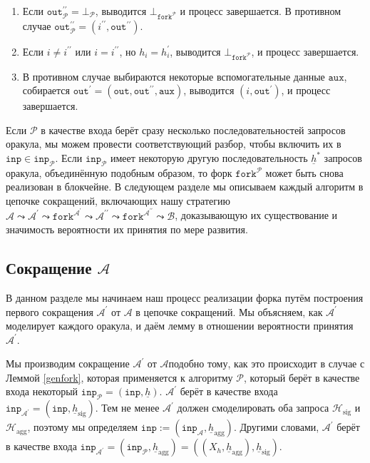 \documentclass{mrl}
\theoremstyle{definition}
\numberwithin{theorem}{subsection}
\newcommand{\adversary}{\mathcal{A}}
\newcommand{\reduxChain}{\adversary \leadsto \adversary^\prime \leadsto \texttt{fork}^{\adversary^\prime} \leadsto \adversary^{\prime \prime} \leadsto \texttt{fork}^{\adversary^{\prime \prime}} \leadsto \mathcal{B}}
\begin{document}
\begin{description}
\begin{enumerate}
\item Если $\texttt{out}_{\mathcal{P}}^{\prime \prime} = \bot_\mathcal{P}$, выводится $\bot_{\texttt{fork}^{\mathcal{P}}}$ и процесс завершается. В противном случае $\texttt{out}_{\mathcal{P}}^{\prime \prime} = (i^{\prime \prime}, \texttt{out}^{\prime \prime})$.

\item Если $i \neq i^{\prime \prime}$ или $i = i^{\prime \prime}$, но $h_{i} = h^{\prime}_{i}$, выводится $\bot_{\texttt{fork}^{\mathcal{P}}}$, и процесс завершается.

\item В противном случае выбираются некоторые вспомогательные данные $\texttt{aux}$, собирается $\texttt{out}^\prime = (\texttt{out}, \texttt{out}^{\prime\prime}, \texttt{aux})$, выводится $(i, \texttt{out}^\prime)$, и процесс завершается.
\end{enumerate}

\end{description}
Если $\mathcal{P}$ в качестве входа берёт сразу несколько последовательностей запросов оракула, мы можем провести соответствующий разбор, чтобы включить их в $\texttt{inp} \in \texttt{inp}_{\mathcal{P}}$. Если $\texttt{inp}_{\mathcal{P}}$ имеет некоторую другую последовательность $\underline{h}^*$ запросов оракула, объединённую подобным образом, то форк $\texttt{fork}^{\mathcal{P}}$ может быть снова реализован в блокчейне. В следующем разделе мы описываем каждый алгоритм в цепочке сокращений, включающих нашу стратегию $\reduxChain$, доказывающую их существование и значимость вероятности их принятия по мере развития.

\subsection{Сокращение $\mathcal{A}$}\label{reducingA}

В данном разделе мы начинаем наш процесс реализации форка путём построения первого сокращения $\adversary^\prime$ от $\adversary$ в цепочке сокращений. Мы объясняем, как $\adversary^\prime$ моделирует каждого оракула, и даём лемму в отношении вероятности принятия $\adversary^\prime$.

Мы производим сокращение $\adversary^\prime$ от $\adversary$подобно тому, как это происходит в случае с Леммой \ref{genfork}, которая применяется к алгоритму $\mathcal{P}$, который берёт в качестве входа некоторый $\texttt{inp}_\mathcal{P} = (\texttt{inp}, \underline{h})$. $\adversary^\prime$ берёт в качестве входа $\texttt{inp}_{\adversary^\prime} = (\texttt{inp}, \underline{h}_{\text{sig}})$. Тем не менее $\adversary^\prime$ должен смоделировать оба запроса $\mathcal{H}_{\text{sig}}$ и $\mathcal{H}_{\text{agg}}$, поэтому мы определяем $\texttt{inp} := (\texttt{inp}_{\adversary}, \underline{h}_{\text{agg}})$. Другими словами, $\adversary^\prime$ берёт в качестве входа $\texttt{inp}_{\adversary^\prime} = (\texttt{inp}_\mathcal{P}, \underline{h}_{\text{agg}}) = \left((X_h, \underline{h}_{\text{agg}}), \underline{h}_{\text{sig}}\right)$.
\end{document}
